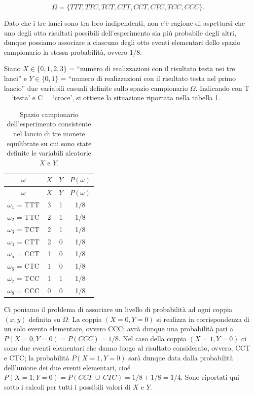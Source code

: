 \documentclass[
  11pt,
]{krantz}
\theoremstyle{definition}
\theoremstyle{definition}
\theoremstyle{definition}
\theoremstyle{definition}
\theoremstyle{remark}
\begin{document}
\[
\Omega = \{TTT, TTC, TCT, CTT, CCT, CTC, TCC, CCC\}.
\]

Dato che i tre lanci sono tra loro indipendenti, non c'è ragione di aspettarsi che uno degli otto risultati possibili dell'esperimento sia più probabile degli altri, dunque possiamo associare a ciascuno degli otto eventi elementari dello spazio campionario la stessa probabilità, ovvero 1/8.

Siano \(X \in \{0, 1, 2, 3\}\) = ``numero di realizzazioni con il risultato testa nei tre lanci'' e \(Y \in \{0, 1\}\) = ``numero di realizzazioni con il risultato testa nel primo lancio'' due variabili casuali definite sullo spazio campionario \(\Omega\). Indicando con T = `testa' e C = `croce', si ottiene la situazione riportata nella tabella \ref{tab:tre-monete-distr-cong-1}.

\begin{longtable}[]{@{}cccc@{}}
\caption{\label{tab:tre-monete-distr-cong-1} Spazio campionario dell'esperimento consistente nel lancio di tre monete equilibrate su cui sono state definite le variabili aleatorie \(X\) e \(Y\).}\tabularnewline
\toprule
\(\omega\) & \(X\) & \(Y\) & \(P(\omega)\) \\
\midrule
\endfirsthead
\toprule
\(\omega\) & \(X\) & \(Y\) & \(P(\omega)\) \\
\midrule
\endhead
\(\omega_1\) = TTT & 3 & 1 & 1/8 \\
\(\omega_2\) = TTC & 2 & 1 & 1/8 \\
\(\omega_3\) = TCT & 2 & 1 & 1/8 \\
\(\omega_4\) = CTT & 2 & 0 & 1/8 \\
\(\omega_5\) = CCT & 1 & 0 & 1/8 \\
\(\omega_6\) = CTC & 1 & 0 & 1/8 \\
\(\omega_7\) = TCC & 1 & 1 & 1/8 \\
\(\omega_8\) = CCC & 0 & 0 & 1/8 \\
\bottomrule
\end{longtable}

Ci poniamo il problema di associare un livello di probabilità ad ogni coppia \((x, y)\) definita su \(\Omega\). La coppia \((X = 0, Y = 0)\) si realizza in corrispondenza di un solo evento elementare, ovvero CCC; avrà dunque una probabilità pari a \(P(X=0, Y=0) = P(CCC) = 1/8\). Nel caso della coppia \((X = 1, Y = 0)\) ci sono due eventi elementari che danno luogo al risultato considerato, ovvero, CCT e CTC; la probabilità \(P(X=1, Y=0)\) sarà dunque data dalla probabilità dell'unione dei due eventi elementari, cioé \(P(X=1, Y=0) = P(CCT \:\cup\: CTC) = 1/8 + 1/8 = 1/4\). Sono riportati qui sotto i calcoli per tutti i possibili valori di \(X\) e \(Y\).
\end{document}
